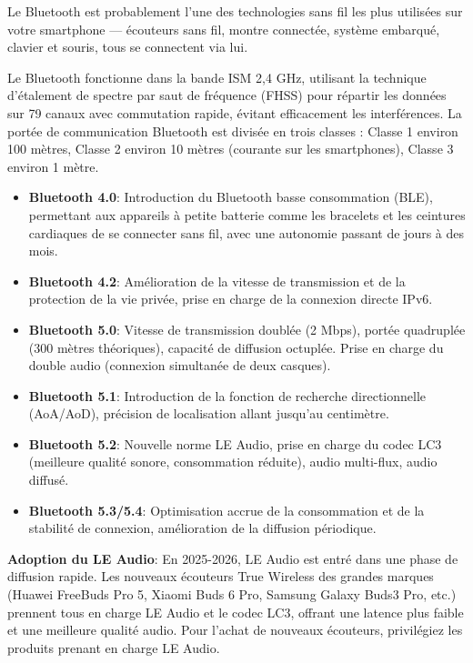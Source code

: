 Le Bluetooth est probablement l'une des technologies sans fil les plus utilisées sur votre smartphone — écouteurs sans fil, montre connectée, système embarqué, clavier et souris, tous se connectent via lui.


Le Bluetooth fonctionne dans la bande ISM 2,4 GHz, utilisant la technique d'étalement de spectre par saut de fréquence (FHSS) pour répartir les données sur 79 canaux avec commutation rapide, évitant efficacement les interférences. La portée de communication Bluetooth est divisée en trois classes : Classe 1 environ 100 mètres, Classe 2 environ 10 mètres (courante sur les smartphones), Classe 3 environ 1 mètre.


\begin{itemize}
  \item \textbf{Bluetooth 4.0}: Introduction du Bluetooth basse consommation (BLE), permettant aux appareils à petite batterie comme les bracelets et les ceintures cardiaques de se connecter sans fil, avec une autonomie passant de jours à des mois.
  \item \textbf{Bluetooth 4.2}: Amélioration de la vitesse de transmission et de la protection de la vie privée, prise en charge de la connexion directe IPv6.
  \item \textbf{Bluetooth 5.0}: Vitesse de transmission doublée (2 Mbps), portée quadruplée (300 mètres théoriques), capacité de diffusion octuplée. Prise en charge du double audio (connexion simultanée de deux casques).
  \item \textbf{Bluetooth 5.1}: Introduction de la fonction de recherche directionnelle (AoA/AoD), précision de localisation allant jusqu'au centimètre.
  \item \textbf{Bluetooth 5.2}: Nouvelle norme LE Audio, prise en charge du codec LC3 (meilleure qualité sonore, consommation réduite), audio multi-flux, audio diffusé.
  \item \textbf{Bluetooth 5.3/5.4}: Optimisation accrue de la consommation et de la stabilité de connexion, amélioration de la diffusion périodique.
\end{itemize}

\textbf{Adoption du LE Audio}: En 2025-2026, LE Audio est entré dans une phase de diffusion rapide. Les nouveaux écouteurs True Wireless des grandes marques (Huawei FreeBuds Pro 5, Xiaomi Buds 6 Pro, Samsung Galaxy Buds3 Pro, etc.) prennent tous en charge LE Audio et le codec LC3, offrant une latence plus faible et une meilleure qualité audio. Pour l'achat de nouveaux écouteurs, privilégiez les produits prenant en charge LE Audio.

